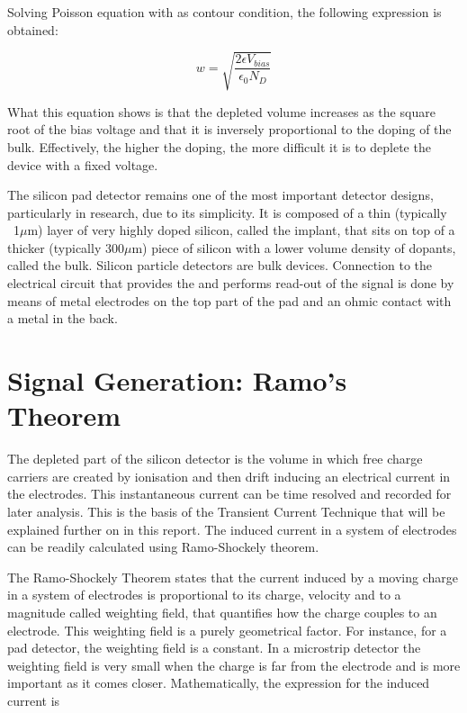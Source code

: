 Solving Poisson equation with \vias as contour condition, the following
expression is obtained: 

\begin{equation}
w = \sqrt{\frac{2\epsilon V_{bias}}{\epsilon_0 N_D}}
\label{eq:widthVias}
\end{equation}

What this equation shows is that the depleted volume increases as the square
root of the bias voltage and that it is inversely proportional to the doping of the
bulk. Effectively, the higher the doping, the more difficult it is to deplete the
device with a fixed voltage. 

The silicon pad detector remains one of the most important detector designs,
particularly in research, due to its simplicity. It is composed of a thin
(typically ~1$\mu$m) layer of very highly doped silicon, called the implant,
that sits on top of a thicker (typically 300$\mu$m) piece of silicon with a
lower volume density of dopants, called the bulk. Silicon particle detectors are
bulk devices. Connection to the electrical circuit that provides the \vias and
performs read-out of the signal is done by means of metal electrodes on the top
part of the pad and an ohmic contact with a metal in the back. 

\section{Signal Generation: Ramo's Theorem} %
\label{sec:Ramo}

The depleted part of the silicon detector is the volume in which free
charge carriers are created by ionisation and then drift inducing an electrical
current in the electrodes. This instantaneous current can be time resolved and
recorded for later analysis. This is the basis of the Transient Current
Technique that will be explained further on in this report. The induced current
in a system of electrodes can be readily calculated using Ramo-Shockely theorem.


The Ramo-Shockely Theorem states that the current induced by a moving charge in
a system of electrodes is proportional to its charge, velocity and to a
magnitude called weighting field, that quantifies how the charge couples to an
electrode. This weighting field is a purely geometrical factor. For instance,
for a pad detector, the weighting field is a constant. In a microstrip detector
the weighting field is very small when the charge is far from the electrode and
is more important as it comes closer. Mathematically, the expression for the
induced current is

